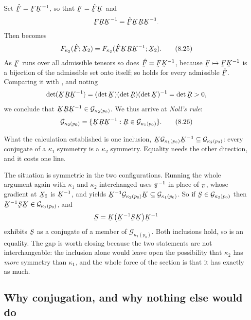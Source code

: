 Set $\hat\bF=\bF\bK^{-1}$, so that $\bF=\hat\bF\bK$ and
\[
   \bF\bR\bK^{-1}=\hat\bF\bK\bR\bK^{-1}.
\]
Then  becomes
\begin{equation}
   F_{\kappa_{2}}(\hat\bF;\bX_{2})
   =F_{\kappa_{2}}(\hat\bF\bK\bR\bK^{-1};\bX_{2}).
   \tag{8.25}\label{eq:8.25}
\end{equation}
As $\bF$ runs over all admissible tensors so does $\hat\bF=\bF\bK^{-1}$,
because $\bF\mapsto\bF\bK^{-1}$ is a bijection of the admissible set
onto itself; so  holds for every admissible $\hat\bF$. Comparing
it with , and noting
\[
   \det(\bK\bR\bK^{-1})
   =(\det\bK)(\det\bR)(\det\bK)^{-1}=\det\bR>0,
\]
we conclude that $\bK\bR\bK^{-1}\in\mathcal{G}_{\kappa_{2}(p_{0})}$. We
thus arrive at \emph{Noll's rule}:
\begin{equation}
   \mathcal{G}_{\kappa_{2}(p_{0})}
   =\{\bK\bR\bK^{-1}:\bR\in\mathcal{G}_{\kappa_{1}(p_{0})}\}.
   \tag{8.26}\label{eq:8.26}
\end{equation}

\begin{remark}\label{rem:ch8converse}
What the calculation established is one inclusion,
$\bK\mathcal{G}_{\kappa_{1}(p_{0})}\bK^{-1}\subseteq
\mathcal{G}_{\kappa_{2}(p_{0})}$: every conjugate of a $\kappa_{1}$
symmetry is a $\kappa_{2}$ symmetry. Equality needs the other direction,
and it costs one line.

The situation is symmetric in the two configurations. Running the whole
argument again with $\kappa_{1}$ and $\kappa_{2}$ interchanged uses
$\vek{\pi}^{-1}$ in place of $\vek{\pi}$, whose gradient at $\bX_{2}$ is
$\bK^{-1}$, and yields
$\bK^{-1}\mathcal{G}_{\kappa_{2}(p_{0})}\bK\subseteq
\mathcal{G}_{\kappa_{1}(p_{0})}$. So if $\bS\in
\mathcal{G}_{\kappa_{2}(p_{0})}$ then $\bK^{-1}\bS\bK\in
\mathcal{G}_{\kappa_{1}(p_{0})}$, and
\[
   \bS=\bK\big(\bK^{-1}\bS\bK\big)\bK^{-1}
\]
exhibits $\bS$ as a conjugate of a member of
$\mathcal{G}_{\kappa_{1}(p_{0})}$. Both inclusions hold, so 
is an equality. The gap is worth closing because the two statements are
not interchangeable: the inclusion alone would leave open the
possibility that $\kappa_{2}$ has \emph{more} symmetry than $\kappa_{1}$,
and the whole force of the section is that it has exactly as much.
\end{remark}

\subsection*{Why conjugation, and why nothing else would do}

